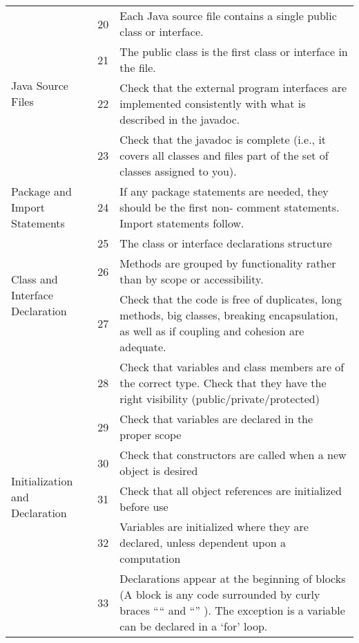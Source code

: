 \documentclass[11pt, a4paper,titlepage]{article}
\begin{document}
									\begin{tabularx}{\textwidth}{| X | l | X |}
										\hline
	\multirow{4}{*}{Java Source Files} 	& \label{itm:20} 20 &  
										Each Java source file contains a single public class or interface.
										\\	\cline{2-3}
										& \label{itm:21} 21 &  
										The public class is the first class or interface in the file.
										\\	\cline{2-3}
										& \label{itm:22} 22 &  
										Check that the external program interfaces are implemented consistently
										with what is described in the javadoc.
										\\	\cline{2-3}	
										& \label{itm:23} 23 &  
										Check that the javadoc is complete (i.e., it covers all classes and files part
										of the set of classes assigned to you).
										\\   \hline
	\multirow{1}{*}{Package and Import Statements} 	& \label{itm:24} 24 &  
										If any package statements are needed, they should be the first non-
										comment statements. Import statements follow.
										\\	\hline
	\multirow{3}{*}{Class and Interface Declaration}& \label{itm:25} 25 &  
										The class or interface declarations structure
										\\	\cline{2-3}
										& \label{itm:26} 26 &  
										Methods are grouped by functionality rather than by scope or
										accessibility.
										\\	\cline{2-3}
										& \label{itm:27} 27 & 
										Check that the code is free of duplicates, long methods, big classes,
										breaking encapsulation, as well as if coupling and cohesion are adequate.
										 \\   \hline
	\multirow{6}{*}{Initialization and Declaration}	& \label{itm:28} 28 &  
										Check that variables and class members are of the correct type. Check that
										they have the right visibility (public/private/protected)
										\\	\cline{2-3}
										& \label{itm:29} 29 &  
										Check that variables are declared in the proper scope
										\\	\cline{2-3}
										& \label{itm:30} 30 &  
										Check that constructors are called when a new object is desired
										\\	\cline{2-3}
										& \label{itm:31} 31 &  
										Check that all object references are initialized before use
										\\	\cline{2-3}
										& \label{itm:32} 32 &  
										Variables are initialized where they are declared, unless dependent upon
										a computation
										\\	\cline{2-3}
										& \label{itm:33} 33 &  
										Declarations appear at the beginning of blocks (A block is any code
										surrounded by curly braces “{“ and “}” ). The exception is a variable can
										be declared in a ‘for’ loop.
										\\   \hline
										
									\end{tabularx}
\end{document}
